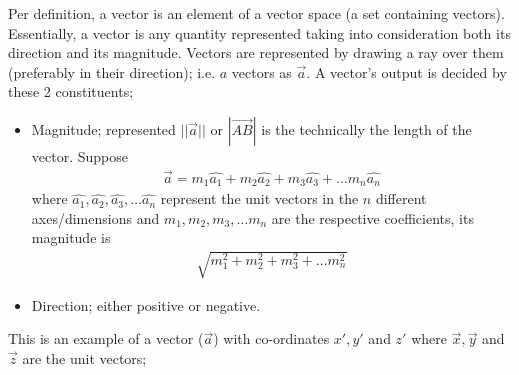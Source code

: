 \begin{phybox}{}
{Per definition, a vector is an element of a vector space (a set containing vectors). Essentially, a vector is any quantity represented taking into consideration both its direction and its magnitude. Vectors are represented by drawing a ray over them (preferably in their direction); i.e. $a$ vectors as  $\Vec{a}$. 
A vector's output is decided by these 2 constituents;
\begin{itemize}
    \item{Magnitude; represented $||\Vec{a}||$ or $|\Vec{AB}|$ is the technically the length of the vector. Suppose 
    \begin{align*}
        \Vec{a} = m_1 \hat{a_1} + m_2 \hat{a_2} + m_3 \hat{a_3} + \dots m_n \hat{a_n}
    \end{align*} 
     where $\hat{a_1}, \hat{a_2}, \hat{a_3}, \dots \hat{a_n}$ represent the unit vectors in the $n$ different axes/dimensions and $m_1, m_2, m_3, \dots m_n$ are the respective coefficients,
    its magnitude is
    \begin{align*}
    \sqrt{m_1^2 + m_2^2 + m_3^2 + \dots m_n^2}
    \end{align*}}
    \item{Direction; either positive or negative.}
\end{itemize}
This is an example of a vector ($\Vec{a}$) with co-ordinates $x', y'$ and $z'$ where $\Vec{x}, \Vec{y}$ and $\Vec{z}$ are the unit vectors;
\begin{center}

\end{center}}
\end{phybox}
